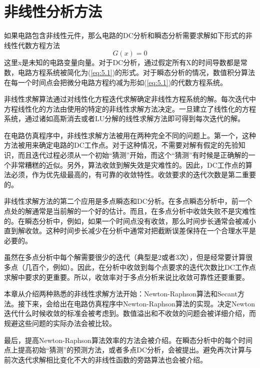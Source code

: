 \chapter{非线性分析方法}
\label{chap:5}
如果电路包含非线性元件，那么电路的DC分析和瞬态分析需要求解如下形式的非线性代数方程方法
\begin{equation}
    G(x)=0
    \label{eq:5.1}
\end{equation}
这里x是未知的电路变量向量。对于DC分析，通过假定所有X的时间导数都是常数，电路方程系统被简化为(\ref{eq:5.1})的形式。对于瞬态分析的情况，数值积分算法在每一个时间点会把微分电路方程约减为形如(\ref{eq:5.1})的代数方程系统。

非线性求解算法通过对线性化方程迭代求解确定非线性方程系统的解。每次迭代中方程线性化的方法由使用的特定的非线性求解方法决定。一旦建立了线性化的方程系统，通过诸如高斯消去或者LU分解的线性求解方法即可得到每次迭代的解。

在电路仿真程序中，非线性求解方法被用在两种完全不同的问题上。第一个，这种方法被用来确定电路的DC工作点。对于这种情况，不需要对解有假定的先验知识，而且迭代过程必须从一个初始“猜测”开始，而这个“猜测”有时候是正确解的一个非常糟糕的近似。另外，算法收敛到解失效是灾难性的。因此，DC工作点的算法必须，作为优先级最高的，有可靠的收敛特性。收敛要求的迭代次数是第二重要的。

非线性求解方法的第二个应用是多点瞬态和DC分析。在多点瞬态分析中，前一个点处的解通常是当前解的一个好的估计。而且，在多点分析中收敛失败不是灾难性的。在瞬态分析中，例如，如果一个时间点没有收敛，那么时间步长通常会被减小直到解收敛。这种时间步长减少在分析中通常对把截断误差保持在一个合理水平是必要的。

虽然在多点分析中每个解需要很少的迭代（典型是2或者3次），但是经常要计算很多点（几百个，例如）。因此，在分析中收敛到每个点要求的迭代次数比DC工作点求解中要求的更重要。所以，收敛率对于多点分析来说比收敛可靠性还要重要。

本章从介绍两种熟悉的非线性求解方法开始：Newton-Raphson算法和Secant方法。接下来，会给出在电路仿真程序中Newton-Raphson算法的实现。决定Newton迭代什么时候收敛的标准会被考虑到。数值溢出和不收敛的问题会被详细介绍，而规避这些问题的实际办法会被比较。

最后，提高Newton-Raphson算法效率的方法会被介绍。在瞬态分析中的每个时间点上提高初始“猜测”的预测方法，或者多点DC分析，会被提出。避免再次计算与前次迭代求解相比变化不大的非线性函数的旁路算法也会被介绍。


